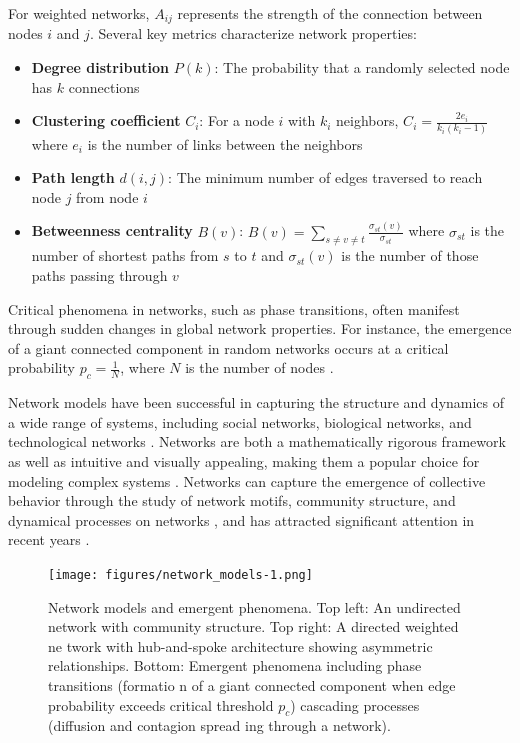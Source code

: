 For weighted networks, $A_{ij}$ represents the strength of the connection between nodes $i$ and $j$. Several key metrics characterize network properties:

\begin{itemize}
    \item \textbf{Degree distribution} $P(k)$: The probability that a randomly selected node has $k$ connections
    \item \textbf{Clustering coefficient} $C_i$: For a node $i$ with $k_i$ neighbors, $C_i = \frac{2e_i}{k_i(k_i-1)}$ where $e_i$ is the number of links between the neighbors
    \item \textbf{Path length} $d(i,j)$: The minimum number of edges traversed to reach node $j$ from node $i$
    \item \textbf{Betweenness centrality} $B(v)$: $B(v) = \sum_{s \neq v \neq t} \frac{\sigma_{st}(v)}{\sigma_{st}}$ where $\sigma_{st}$ is the number of shortest paths from $s$ to $t$ and $\sigma_{st}(v)$ is the number of those paths passing through $v$
\end{itemize}

Critical phenomena in networks, such as phase transitions, often manifest through sudden changes in global network properties. For instance, the emergence of a giant connected component in random networks occurs at a critical probability $p_c = \frac{1}{N}$, where $N$ is the number of nodes \citep{erdos1960evolution}.

Network models have been successful in capturing the structure and dynamics of a wide range of systems, including social networks, biological networks, and technological networks \citep{newman2003structure, albert2002statistical, strogatz2001exploring}. Networks are both a mathematically rigorous framework as well as intuitive and visually appealing, making them a popular choice for modeling complex systems \citep{newman2010networks}. Networks can capture the emergence of collective behavior through the study of network motifs, community structure, and dynamical processes on networks \citep{milo2002network, fortunato2010community, barrat2008dynamical}, and has attracted significant attention in recent years \citep{barabasi2016network}.

\begin{figure}[htbp]
    \centering
    \texttt{[image: figures/network\_models-1.png]}
    \caption{Network models and emergent phenomena. Top left: An undirected network with community structure. Top right: A directed weighted ne
    twork with hub-and-spoke architecture showing asymmetric relationships. Bottom: Emergent    phenomena including phase transitions (formatio
    n of a giant connected component when edge probability exceeds critical threshold $p_c$)    cascading processes (diffusion and contagion spread
    ing through a network).}
    \label{fig:network_models}
\end{figure}


